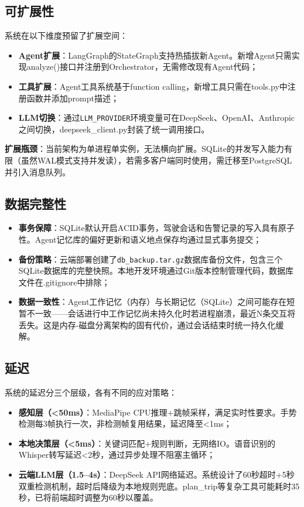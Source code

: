 \documentclass[a4paper]{article}
\begin{document}
\subsection{可扩展性}

系统在以下维度预留了扩展空间：

\begin{itemize}
    \item \textbf{Agent扩展}：LangGraph的StateGraph支持热插拔新Agent。新增Agent只需实现analyze()接口并注册到Orchestrator，无需修改现有Agent代码；
    \item \textbf{工具扩展}：Agent工具系统基于function calling，新增工具只需在tools.py中注册函数并添加prompt描述；
    \item \textbf{LLM切换}：通过\texttt{LLM\_PROVIDER}环境变量可在DeepSeek、OpenAI、Anthropic之间切换，deepseek\_client.py封装了统一调用接口。
\end{itemize}

\textbf{扩展瓶颈}：当前架构为单进程单实例，无法横向扩展。SQLite的并发写入能力有限（虽然WAL模式支持并发读），若需多客户端同时使用，需迁移至PostgreSQL并引入消息队列。

\subsection{数据完整性}

\begin{itemize}
    \item \textbf{事务保障}：SQLite默认开启ACID事务，驾驶会话和告警记录的写入具有原子性。Agent记忆库的偏好更新和语义地点保存均通过显式事务提交；
    \item \textbf{备份策略}：云端部署创建了\texttt{db\_backup.tar.gz}数据库备份文件，包含三个SQLite数据库的完整快照。本地开发环境通过Git版本控制管理代码，数据库文件在.gitignore中排除；
    \item \textbf{数据一致性}：Agent工作记忆（内存）与长期记忆（SQLite）之间可能存在短暂不一致——会话进行中工作记忆尚未持久化时若进程崩溃，最近N条交互将丢失。这是内存-磁盘分离架构的固有代价，通过会话结束时统一持久化缓解。
\end{itemize}

\subsection{延迟}

系统的延迟分三个层级，各有不同的应对策略：

\begin{itemize}
    \item \textbf{感知层（<50ms）}：MediaPipe CPU推理+跳帧采样，满足实时性要求。手势检测每3帧执行一次，非检测帧复用结果，延迟降至<1ms；
    \item \textbf{本地决策层（<5ms）}：关键词匹配+规则判断，无网络IO。语音识别的Whisper转写延迟<2秒，通过异步处理不阻塞主循环；
    \item \textbf{云端LLM层（1.5--4s）}：DeepSeek API网络延迟。系统设计了60秒超时+5秒双重检测机制，超时后降级为本地规则兜底。plan\_trip等复杂工具可能耗时35秒，已将前端超时调整为60秒以覆盖。
\end{itemize}
\end{document}
